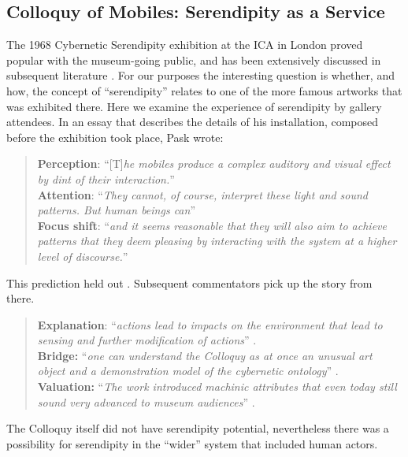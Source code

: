 \subsection{{\sf Colloquy of Mobiles}: Serendipity as a Service}

The 1968 Cybernetic Serendipity exhibition at the ICA in London proved popular with the museum-going public, and has been extensively discussed in subsequent literature
\cite{Edmonds1994,macgregor2002cybernetic,usselmann2003dilemma}.  For
our purposes the interesting question is whether, and how, the concept
of ``serendipity'' relates to one of the more famous artworks that was
exhibited there.
Here we examine the experience of serendipity by gallery attendees.
In an essay that describes the details of his installation, composed
before the exhibition took place, Pask wrote:

\begin{quote}
\textbf{Perception}: ``[T]\emph{he mobiles produce a complex auditory
  and visual effect by dint of their interaction.}''\\
\textbf{Attention}: ``\emph{They cannot, of course, interpret these
  light and sound patterns.  But human beings can}''\\
\textbf{Focus shift}: ``\emph{and it seems reasonable that they will
  also aim to achieve patterns that they deem pleasing by interacting
  with the system at a higher level of discourse.}''
\cite[p.~91]{pask1971comment} 
\end{quote}
This prediction held out \cite[p.~98]{pask1971comment}.  Subsequent
commentators pick up the story from there.
\begin{quote}
\textbf{Explanation}: ``\emph{actions lead to impacts on the environment that lead to sensing and further modification of actions}'' \cite{haque2007architectural}.\\
\textbf{Bridge:} 
``\emph{one can understand the Colloquy as at once an unusual art
  object and a demonstration model of the cybernetic ontology}''
\cite[p.~48]{pickering2007ontological}.\\
\textbf{Valuation:} 
``\emph{The work introduced machinic attributes that even today still sound
very advanced to museum audiences}''
\cite[p.~5]{gemeinboeck2015performance}.
\end{quote}
The Colloquy itself did not have serendipity potential, nevertheless
there was a possibility for serendipity in the ``wider'' system that
included human actors.

